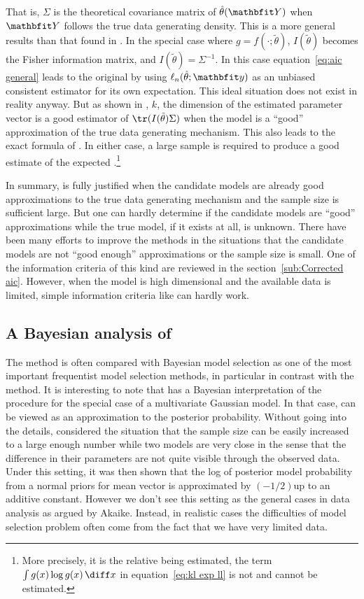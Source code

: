 That is, $\Sigma$ is the theoretical covariance matrix of $\hat\theta(\bfY)$ when
$\bfY$ follows the true data generating density. This is a more general
results than that found in \cite{Akaike:1973uc}. In the special case where
$g = f(\cdot;\tilde\theta)$, $I(\tilde\theta)$ becomes the Fisher information matrix, and
$I(\tilde\theta) = \Sigma^{-1}$. In this case equation~\eqref{eq:aic general} leads
to the original \aic by using $\ell_n(\hat\theta;\bfy)$ as an unbiased consistent
estimator for its own expectation. This ideal situation does not exist in
reality anyway. But as shown in \cite{Shibata:1989tm}, $k$, the dimension
of the estimated parameter vector is a good estimator of $\tr(I(\tilde\theta)\Sigma)$
when the model is a ``good'' approximation of the true data generating
mechanism. This also leads to the exact formula of \aic. In either case, a
large sample is required to produce a good estimate of the expected
\kl.\footnote{More precisely, it is the relative \kl being estimated, the term
  $\int g(x)\log g(x)\intd x$ in equation~\eqref{eq:kl exp ll} is not and cannot
  be estimated.}

In summary, \aic is fully justified when the candidate models are already good
approximations to the true data generating mechanism and the sample size is
sufficient large. But one can hardly determine if the candidate models are
``good'' approximations while the true model, if it exists at all, is unknown.
There have been many efforts to improve the \aic methods in the situations
that the candidate models are not ``good enough'' approximations or the sample
size is small. One of the information criteria of this kind are reviewed in
the section~\ref{sub:Corrected aic}. However, when the model is high
dimensional and the available data is limited, simple information criteria
like \aic can hardly work.

\subsection{A Bayesian analysis of \protect\aic}
\label{sub:A Bayesian analysis of aic}

The \aic method is often compared with Bayesian model selection as one of the
most important frequentist model selection methods, in particular in contrast
with the \bic method. It is interesting to note that \cite{Akaike:1978ti}
has a Bayesian interpretation of the \aic procedure for the special case of a
multivariate Gaussian model. In that case, \aic can be viewed as an
approximation to the posterior probability. Without going into the details,
\cite{Akaike:1978ti} considered the situation that the sample size can be
easily increased to a large enough number while two models are very close in
the sense that the difference in their parameters are not quite visible
through the observed data. Under this setting, it was then shown that the log
of posterior model probability from a normal priors for mean vector is
approximated by $(-1/2)$\aic up to an additive constant. However we don't see
this setting as the general cases in data analysis as argued by Akaike.
Instead, in realistic cases the difficulties of model selection problem often
come from the fact that we have very limited data.

